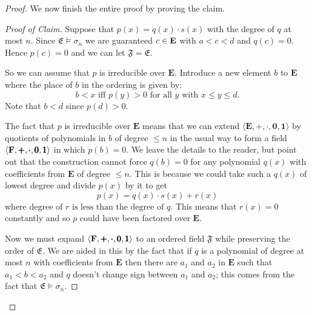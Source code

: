 \documentclass[titlepage, oneside]{amsbook}
\theoremstyle{plain}
\theoremstyle{definition}
\theoremstyle{remark}
\newcommand{\me}{\ensuremath{\mathfrak{E}}}
\newcommand{\mf}{\ensuremath{\mathfrak{F}}}
\newcommand{\be}{\ensuremath{\mathbf{E}}}
\begin{document}
\begin{proof}
We now finish the entire proof by proving the claim.

\begin{proof}[Proof of Claim]  Suppose that $p(x) = q(x) \cdot s(x)$ with the degree of $q$ at most $n$. Since $\me \models \sigma_n$ we are guaranteed $c \in \bf{E}$ with $ a < c < d$ and $q(c) = 0$. Hence $p(c) = 0$ and we can let $\mf = \me$.

So we can assume that $p$ is irreducible over $\be$. Introduce a new
element $b$ to $\be$ where the place of $b$ in the ordering is given
by:
 \[ b < x \mbox{  iff  } p (y) > 0 \mbox{ for all $y$ with }x \leq y \leq d. \]
Note that $b < d$ since $p(d) > 0$.

The fact that $p$ is irreducible over $\be$ means that we can extend
$\langle \be ,\pmb{ +} , \pmb{\cdot} , \pmb{0} ,\pmb{ 1} \rangle$ by
quotients of polynomials in $b$ of degree $\leq n$ in the usual way to form a field 
$\langle \bf{F}, \pmb{+} ,\pmb{\cdot} , \pmb{0} , \pmb{1} \rangle$ in which 
$p(b) = 0$.  We leave the details to the reader, but point out that
the construction cannot force $q(b) = 0$ for any polynomial $q(x)$ with
coefficients from $\be$  of degree $\leq n$.  
This is because we could take such a $q(x)$ of lowest
degree and divide $p(x)$ by  it to get \[ p(x) = q(x) \cdot s(x) +
r(x) \] where $\mbox{degree of } r  \mbox{ is less than the degree of } q$.  This means
that $r(x) =0$ constantly and so $p$ could have been factored over $\be$.  

Now we must expand $\langle \bf{F}, \pmb{ +} , \pmb{\cdot}, \pmb{ 0}
,\pmb{1} \rangle$ to an ordered field
$\mf$ while preserving the order of $\me$.  We are aided in this by the
fact that if $q$ is a polynomial of degree at most $n$ with
coefficients from $\be$ then there are $a_1$ and $a_2$ in $\be$ such
that $a_1 < b < a_2$ and $q$ doesn't change sign between $a_1$ and
$a_2$; this comes from the fact that $\me \models \sigma_n$. 
\renewcommand{\qedsymbol}{}
\end{proof}
\end{proof}
\end{document}
